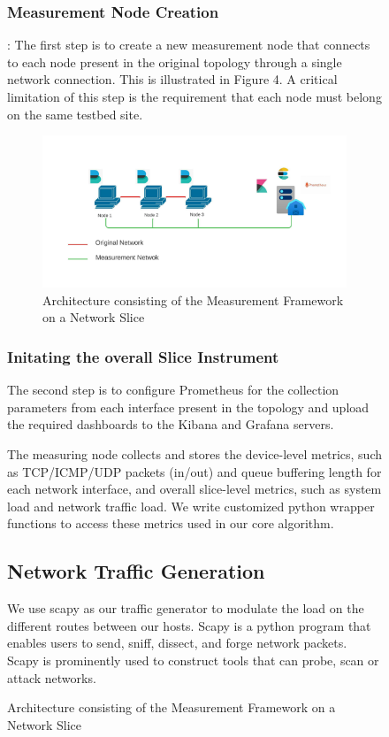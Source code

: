 \documentclass[conference]{IEEEtran}
\begin{document}
\begin{figure}[h!]
    \subsubsection{Measurement Node Creation}: The first step is to create a new measurement node that connects to each node present in the original topology through a single network connection. This is illustrated in Figure 4. A critical limitation of this step is the requirement that each node must belong on the same testbed site.
    
    \begin{figure}[h]
        \includegraphics[scale=0.45]{Mflib.jpeg}
        \centering
        \caption{Architecture consisting of the Measurement Framework on a Network Slice}
    \end{figure}
    
    \subsubsection{Initating the overall Slice Instrument} The second step is to configure Prometheus for the collection parameters from each interface present in the topology and upload the required dashboards to the Kibana and Grafana servers.

    
    The measuring node collects and stores the device-level metrics, such as TCP/ICMP/UDP packets (in/out) and queue buffering length for each network interface, and overall slice-level metrics, such as system load and network traffic load. We write customized python wrapper functions to access these metrics used in our core algorithm.

    \subsection{Network Traffic Generation}
    We use scapy as our traffic generator to modulate the load on the different routes between our hosts. Scapy is a python program that enables users to send, sniff, dissect, and forge network packets. Scapy is prominently used to construct tools that can probe, scan or attack networks.


\end{figure}
\end{document}
